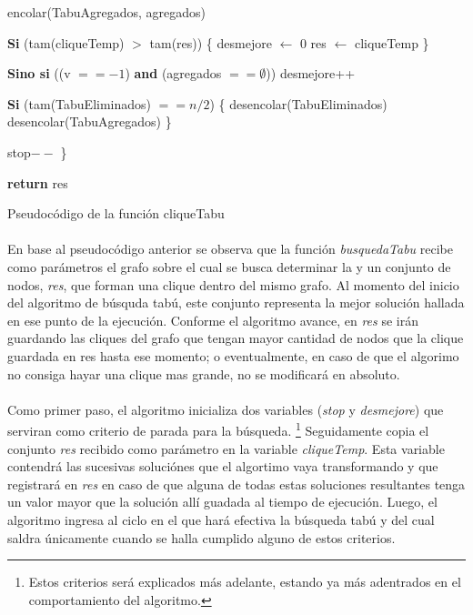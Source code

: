 \begin{algorithm}[H]
	\BlankLine \BlankLine		
	\tab encolar(TabuAgregados, agregados)												
	
	\BlankLine \BlankLine
	\tab \textbf{Si} (tam(cliqueTemp) $>$ tam(res)) \{ 									
	\tab \tab desmejore $\leftarrow$ 0													
	\tab \tab res $\leftarrow$ cliqueTemp												
	\tab \}

	\BlankLine \BlankLine		
	\tab \textbf{Sino si} ((v $== -1$) \textbf{and} (agregados $== \emptyset$)) 	
	\tab \tab desmejore++																
	
	\BlankLine \BlankLine
	\tab \textbf{Si} (tam(TabuEliminados) $== n/2$) \{									
	\tab \tab desencolar(TabuEliminados)												
	\tab \tab desencolar(TabuAgregados)												
	\tab \}	

	\BlankLine \BlankLine
	\tab stop$--$ 																			
	\}
	
	\BlankLine \BlankLine		
	\textbf{return} res																	
\caption{Pseudocódigo de la función cliqueTabu} 
\normalsize
\end{algorithm}

\paragraph{}
En base al pseudocódigo anterior se observa que la función \textit{busquedaTabu} recibe como parámetros el grafo sobre el cual se busca determinar la \mc y un conjunto de nodos, \textit{res}, que forman una clique dentro del mismo grafo. Al momento del inicio del algoritmo de búsquda tabú, este conjunto representa la mejor solución hallada en ese punto de la ejecución. Conforme el algoritmo avance, en \textit{res} se irán guardando las cliques del grafo que tengan mayor cantidad de nodos que la clique guardada en res hasta ese momento; o eventualmente, en caso de que el algorimo no consiga hayar una clique mas grande, no se modificará en absoluto.

\paragraph{}
Como primer paso, el algoritmo inicializa dos variables (\textit{stop} y \textit{desmejore}) que serviran como criterio de parada para la búsqueda. \footnote{Estos criterios será explicados más adelante, estando ya más adentrados en el comportamiento del algoritmo.} Seguidamente copia el conjunto \textit{res} recibido como parámetro en la variable \textit{cliqueTemp}. Esta variable contendrá las sucesivas soluciónes que el algortimo vaya transformando y que registrará en \textit{res} en caso de que alguna de todas estas soluciones resultantes tenga un valor mayor que la solución allí guadada al tiempo de ejecución. Luego, el algoritmo ingresa al ciclo en el que hará efectiva la búsqueda tabú y del cual saldra únicamente cuando se halla cumplido alguno de estos criterios.  

